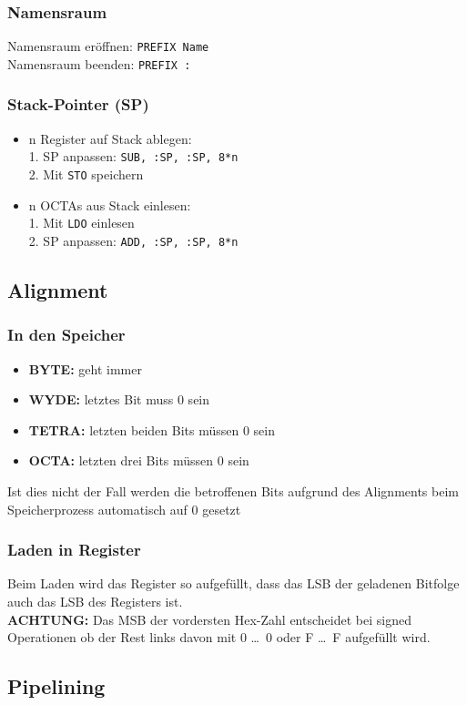 \documentclass[ngerman, threecolumn, 8pt]{latex4ei/latex4ei_sheet}
\begin{document}
\subsubsection{Namensraum}
Namensraum eröffnen: \texttt{PREFIX Name} \\
Namensraum beenden: \texttt{PREFIX :}
\subsubsection{Stack-Pointer (SP)}
\begin{itemize}
\item n Register auf Stack ablegen: \\
1. SP anpassen: \texttt{SUB, :SP, :SP, 8*n}\\
2. Mit \texttt{STO} speichern
\item n OCTAs aus Stack einlesen: \\
1. Mit \texttt{LDO} einlesen\\
2. SP anpassen: \texttt{ADD, :SP, :SP, 8*n}
\end{itemize}
\subsection{Alignment}
\subsubsection{In den Speicher}
\begin{itemize}\itemsep0pt
\item \textbf{BYTE:} geht immer
\item \textbf{WYDE:} letztes Bit muss 0 sein 
\item \textbf{TETRA:} letzten beiden Bits müssen 0 sein 
\item \textbf{OCTA:} letzten drei Bits müssen 0 sein 
\end{itemize}
Ist dies nicht der Fall werden die betroffenen Bits aufgrund des Alignments beim Speicherprozess automatisch auf 0 gesetzt
\subsubsection{Laden in Register}
Beim Laden wird das Register so aufgefüllt, dass das LSB der geladenen Bitfolge auch das LSB des Registers ist. \\
\textbf{ACHTUNG:} Das MSB der vordersten Hex-Zahl entscheidet bei signed Operationen ob der Rest links davon mit 0 \dots \ 0 oder F \dots \ F aufgefüllt wird.
\subsection{Pipelining}
\end{document}
